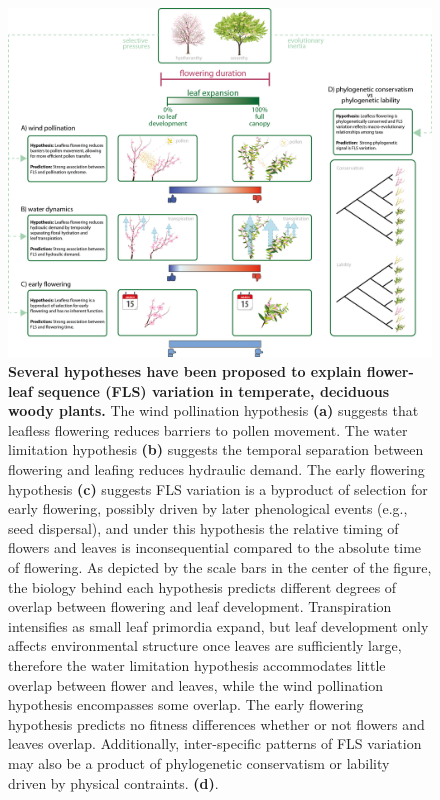 \documentclass[11pt]{article}
\begin{document}
\begin{figure}[h!]
    \centering
 \includegraphics[width=\textwidth]{..//..//HarvardForest/concept_hystheranty_wide_text_overlaps.png}  
    \caption{\textbf{Several hypotheses have been proposed to explain flower-leaf sequence (FLS) variation in temperate, deciduous woody plants.}  The wind pollination hypothesis \textbf{(a)} suggests that leafless flowering reduces barriers to pollen movement. The water limitation hypothesis \textbf{(b)} suggests the temporal separation between flowering and leafing reduces hydraulic demand. The early flowering hypothesis \textbf{(c)} suggests FLS variation is a byproduct of selection for early flowering, possibly driven by later phenological events (e.g., seed dispersal), and under this hypothesis the relative timing of flowers and leaves is inconsequential compared to the absolute time of flowering. As depicted by the scale bars in the center of the figure, the biology behind each hypothesis predicts different degrees of overlap between flowering and leaf development. Transpiration intensifies as small leaf primordia expand, but leaf development only affects environmental structure once leaves are sufficiently large, therefore the water limitation hypothesis accommodates little overlap between flower and leaves, while the wind pollination hypothesis encompasses some overlap. The early flowering hypothesis predicts no fitness differences whether or not flowers and leaves overlap. Additionally, inter-specific patterns of FLS variation may also be a product of phylogenetic conservatism or lability driven by physical contraints. \textbf{(d)}.}
    \label{fig:conceptual}
\end{figure}
\end{document}

